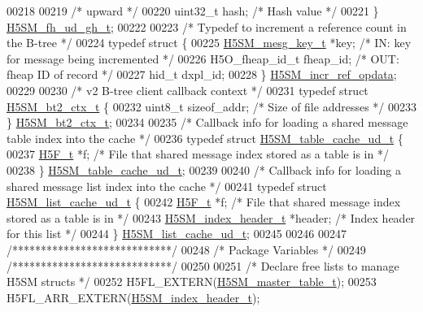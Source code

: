 \begin{DoxyCode}
00218 
00219     \textcolor{comment}{/* upward */}
00220     uint32\_t    hash;                   \textcolor{comment}{/* Hash value */}
00221 \} \hyperlink{struct_h5_s_m__fh__ud__gh__t}{H5SM\_fh\_ud\_gh\_t};
00222 
00223 \textcolor{comment}{/* Typedef to increment a reference count in the B-tree */}
00224 \textcolor{keyword}{typedef} \textcolor{keyword}{struct }\{
00225     \hyperlink{struct_h5_s_m__mesg__key__t}{H5SM\_mesg\_key\_t} *key;       \textcolor{comment}{/* IN: key for message being incremented */}
00226     H5O\_fheap\_id\_t fheap\_id;    \textcolor{comment}{/* OUT: fheap ID of record */}
00227     hid\_t dxpl\_id;
00228 \} \hyperlink{struct_h5_s_m__incr__ref__opdata}{H5SM\_incr\_ref\_opdata};
00229 
00230 \textcolor{comment}{/* v2 B-tree client callback context */}
00231 \textcolor{keyword}{typedef} \textcolor{keyword}{struct }\hyperlink{struct_h5_s_m__bt2__ctx__t}{H5SM\_bt2\_ctx\_t} \{
00232     uint8\_t     sizeof\_addr;    \textcolor{comment}{/* Size of file addresses */}
00233 \} \hyperlink{struct_h5_s_m__bt2__ctx__t}{H5SM\_bt2\_ctx\_t};
00234 
00235 \textcolor{comment}{/* Callback info for loading a shared message table index into the cache */}
00236 \textcolor{keyword}{typedef} \textcolor{keyword}{struct }\hyperlink{struct_h5_s_m__table__cache__ud__t}{H5SM\_table\_cache\_ud\_t} \{
00237     \hyperlink{struct_h5_f__t}{H5F\_t} *f;                   \textcolor{comment}{/* File that shared message index stored as a table is in */}
00238 \} \hyperlink{struct_h5_s_m__table__cache__ud__t}{H5SM\_table\_cache\_ud\_t};
00239 
00240 \textcolor{comment}{/* Callback info for loading a shared message list index into the cache */}
00241 \textcolor{keyword}{typedef} \textcolor{keyword}{struct }\hyperlink{struct_h5_s_m__list__cache__ud__t}{H5SM\_list\_cache\_ud\_t} \{
00242     \hyperlink{struct_h5_f__t}{H5F\_t} *f;                   \textcolor{comment}{/* File that shared message index stored as a table is in */}
00243     \hyperlink{struct_h5_s_m__index__header__t}{H5SM\_index\_header\_t} *header; \textcolor{comment}{/* Index header for this list */}
00244 \} \hyperlink{struct_h5_s_m__list__cache__ud__t}{H5SM\_list\_cache\_ud\_t};
00245 
00246 
00247 \textcolor{comment}{/****************************/}
00248 \textcolor{comment}{/* Package Variables        */}
00249 \textcolor{comment}{/****************************/}
00250 
00251 \textcolor{comment}{/* Declare free lists to manage H5SM structs */}
00252 H5FL\_EXTERN(\hyperlink{struct_h5_s_m__master__table__t}{H5SM\_master\_table\_t});
00253 H5FL\_ARR\_EXTERN(\hyperlink{struct_h5_s_m__index__header__t}{H5SM\_index\_header\_t});

\end{DoxyCode}
